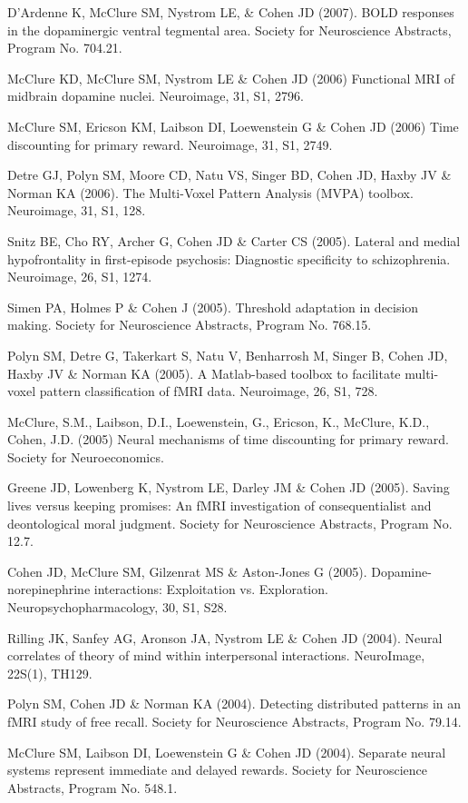 \documentclass[10 pt]{article}
\begin{document}
D'Ardenne K, McClure SM, Nystrom LE, \& Cohen JD (2007). BOLD responses in the dopaminergic ventral tegmental area. Society for Neuroscience Abstracts, Program No. 704.21.

McClure KD, McClure SM, Nystrom LE \& Cohen JD (2006) Functional MRI of midbrain dopamine nuclei. Neuroimage, 31, S1, 2796.

McClure SM, Ericson KM, Laibson DI, Loewenstein G \& Cohen JD (2006) Time discounting for primary reward. Neuroimage, 31, S1, 2749.

Detre GJ, Polyn SM, Moore CD, Natu VS, Singer BD, Cohen JD, Haxby JV \& Norman KA (2006). The Multi-Voxel Pattern Analysis (MVPA) toolbox. Neuroimage, 31, S1, 128.

Snitz BE, Cho RY, Archer G, Cohen JD \& Carter CS (2005). Lateral and medial hypofrontality in first-episode psychosis: Diagnostic specificity to schizophrenia. Neuroimage, 26, S1, 1274.

Simen PA, Holmes P \& Cohen J (2005). Threshold adaptation in decision making. Society for Neuroscience Abstracts, Program No. 768.15.

Polyn SM, Detre G, Takerkart S, Natu V, Benharrosh M, Singer B, Cohen JD, Haxby JV \& Norman KA (2005). A Matlab-based toolbox to facilitate multi-voxel pattern classification of fMRI data. Neuroimage, 26, S1, 728.

McClure, S.M., Laibson, D.I., Loewenstein, G., Ericson, K., McClure, K.D., Cohen, J.D. (2005) Neural mechanisms of time discounting for primary reward. Society for Neuroeconomics.

Greene JD, Lowenberg K, Nystrom LE, Darley JM \& Cohen JD (2005). Saving lives versus keeping promises: An fMRI investigation of consequentialist and deontological moral judgment.
Society for Neuroscience Abstracts, Program No. 12.7.

Cohen JD, McClure SM, Gilzenrat MS \& Aston-Jones G (2005). Dopamine-norepinephrine interactions: Exploitation vs. Exploration. Neuropsychopharmacology, 30, S1, S28.

Rilling JK, Sanfey AG, Aronson JA, Nystrom LE \& Cohen JD (2004). Neural correlates of theory of mind within interpersonal interactions. NeuroImage, 22S(1), TH129.

Polyn SM, Cohen JD \& Norman KA (2004). Detecting distributed patterns in an fMRI study of free recall. Society for Neuroscience Abstracts, Program No. 79.14.

McClure SM, Laibson DI, Loewenstein G \& Cohen JD (2004). Separate neural systems represent immediate and delayed rewards. Society for Neuroscience Abstracts, Program No. 548.1.
\end{document}
